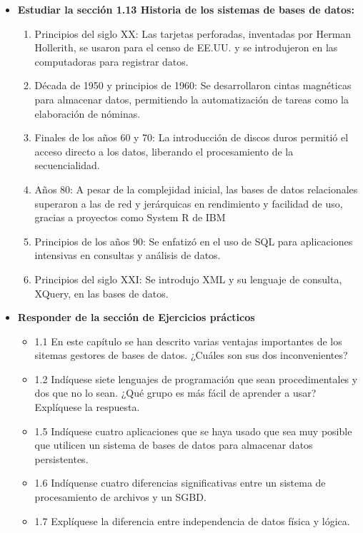 \documentclass[letterpaper,12pt]{article}
\begin{document}
\begin{sloppypar}
\begin{itemize}
    \item \textbf{Estudiar la sección 1.13 Historia de los sistemas de bases de datos:} 
    \begin{enumerate}
        \item Principios del siglo XX: Las tarjetas perforadas, inventadas por Herman Hollerith, se usaron para el censo de EE.UU. y se introdujeron en las computadoras para registrar datos.
        \item Década de 1950 y principios de 1960: Se desarrollaron cintas magnéticas para almacenar datos, permitiendo la automatización de tareas como la elaboración de nóminas.
        \item Finales de los años 60 y 70: La introducción de discos duros permitió el acceso directo a los datos, liberando el procesamiento de la secuencialidad. 
        \item Años 80: A pesar de la complejidad inicial, las bases de datos relacionales superaron a las de red y jerárquicas en rendimiento y facilidad de uso, gracias a proyectos como System R de IBM
        \item Principios de los años 90: Se enfatizó en el uso de SQL para aplicaciones intensivas en consultas y análisis de datos.
        \item Principios del siglo XXI: Se introdujo XML y su lenguaje de consulta, XQuery, en las bases de datos. 
    \end{enumerate}
    \item \textbf{Responder de la sección de Ejercicios prácticos}
    \begin{itemize}
        \item 1.1 En este capítulo se han descrito varias ventajas importantes de los sitemas gestores de bases de datos. ¿Cuáles son sus dos inconvenientes?
        \item 1.2 Indíquese siete lenguajes de programación que sean procedimentales y dos que no lo sean. ¿Qué grupo es más fácil de aprender a usar? Explíquese la respuesta.
        \item 1.5 Indíquese cuatro aplicaciones que se haya usado que sea muy posible que utilicen un sistema de bases de datos para almacenar datos persistentes.
        \item 1.6 Indíquense cuatro diferencias significativas entre un sistema de procesamiento de archivos y un SGBD.
        \item 1.7 Explíquese la diferencia entre independencia de datos física y lógica.
    \end{itemize}
\end{itemize}

\end{sloppypar}
\end{document}
